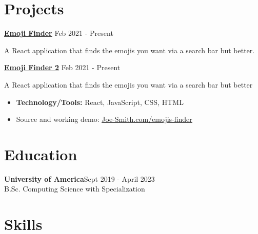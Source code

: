 \documentclass[letterpaper, 10pt]{article}
\newcommand{\bulletSpace}{\vspace{-4pt}}
\newcommand{\secStartSpace}{\vspace{3pt}}
\newcommand{\secEndSpace}{\vspace{5pt}}
\newcommand{\spaceCollapse}{\vspace{-2pt}}
\newcommand{\projectHeader}[3]{
\noindent\href{#2}{\large\textbf{#1}} \hfill \normalsize#3 \vspace{2pt}
}
\begin{document}
\section{\color{blue} \textbf{Projects}}
\secStartSpace

\begin{addmargin}[0.5em]{1em}

		
	\projectHeader{Emoji Finder}{https://github.com/Joe-Smith}{Feb 2021 - Present}
		
	\noindent A React application that finds the emojis you want via a search bar but better.
     \vspace{8pt}
 
	\projectHeader{Emoji Finder 2}{https://github.com/Joe-Smith}{Feb 2021 - Present}
		
	\noindent A React application that finds the emojis you want via a search bar but better
	\spaceCollapse
	\begin{itemize}
		\item \textbf{Technology/Tools:} React, JavaScript, CSS, HTML
		      \bulletSpace
		\item Source and working demo:  \href{https://github.com/Joe-Smith}{\underline{Joe-Smith.com/emojis-finder}}
	\end{itemize}
\end{addmargin}
\secEndSpace
\secEndSpace


\section{\color{blue} \textbf{Education}}
\secStartSpace

\begin{addmargin}[0.5em]{1em}
	\large\textbf{University of America}\hfill \normalsize{Sept 2019 - April 2023}\\
	\setlength\parindent{1cm} B.Sc. Computing Science with Specialization
\end{addmargin}
\secEndSpace
\secEndSpace


\section{\color{blue} \textbf{Skills}}
\secStartSpace
\end{document}
